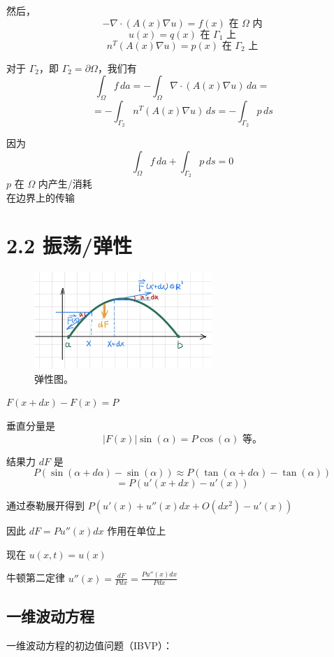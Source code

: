 \documentclass{ctexart}
\begin{document}
然后，
\[
-\nabla \cdot (A(x) \nabla u) = f(x) \text{ 在 } \Omega \text{ 内}
\]
\[
u(x) = q(x) \text{ 在 } \Gamma_1 \text{ 上}
\]
\[
n^T(A(x) \nabla u) = p(x) \text{ 在 } \Gamma_2 \text{ 上}
\]

对于 \( \Gamma_2 \)，即 \( \Gamma_2 = \partial \Omega \)，我们有
\[
\int_{\Omega} f \, da = -\int_{\Omega} \nabla \cdot (A(x) \nabla u) \, da = 
\]
\[
= -\int_{\Gamma_2} n^T (A(x) \nabla u) \, ds = -\int_{\Gamma_2} p \, ds
\]

因为
\[
\int_{\Omega} f \, da + \int_{\Gamma_2} p \, ds = 0
\]
\( p \) 在 \( \Omega \) 内产生/消耗 \\
在边界上的传输

\section*{2.2 振荡/弹性}

\begin{figure}[h!]
\centering
\includegraphics[width=0.6\textwidth]{graph.png}
\caption{弹性图。}
\end{figure}

\( F(x + dx) - F(x) = P \)

垂直分量是
\[
|F(x)| \sin(\alpha) = P \cos(\alpha) \text{ 等。}
\]

结果力 \( dF \) 是
\[
P (\sin(\alpha + d\alpha) - \sin(\alpha)) \approx P (\tan(\alpha + d\alpha) - \tan(\alpha)) 
\]
\[
= P (u'(x + dx) - u'(x))
\]

通过泰勒展开得到 \( P (u'(x) + u''(x)dx + O(dx^2) - u'(x)) \)

因此 \( dF = P u''(x) dx \) 作用在单位上

现在 \( u(x,t) = u(x) \)

牛顿第二定律 \( u''(x) = \frac{dF}{P dx} = \frac{P u''(x) dx}{P dx} \)

\subsection*{一维波动方程}

一维波动方程的初边值问题（IBVP）：
\end{document}
